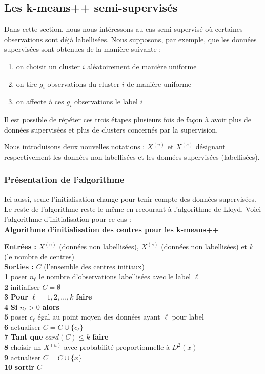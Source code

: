 \documentclass[12pt,a4paper]{book}
\newcommand{\1}{\mathds{1}}
\begin{document}
\subsection{Les k-means++ semi-supervisés}

Dans cette section, nous nous intéressons au cas semi supervisé où certaines observations sont déjà labellisées. Nous supposons, par exemple, que les données supervisées sont obtenues de la manière suivante :
\begin{enumerate}
	\item on choisit un cluster $i$ aléatoirement de manière uniforme
	\item on tire $g_i$ observations du cluster $i$ de manière uniforme
	\item on affecte à ces $g_i$ observations le label $i$
\end{enumerate}
Il est possible de répéter ces trois étapes plusieurs fois de façon à avoir plus de données supervisées et plus de clusters concernés par la supervision.

Nous introduisons deux nouvelles notations : $X^{(u)}$ et $X^{(s)}$ désignant respectivement les données non labellisées et les données supervisées (labellisées). 
	
\subsubsection{Présentation de l'algorithme}

Ici aussi, seule l'initialisation change pour tenir compte des données supervisées. Le reste de l'algorithme reste le même en recourant à l'algorithme de Lloyd. Voici l'algorithme d'initialisation pour ce cas : \\

\noindent \textbf{\underline{Algorithme d'initialisation des centres pour les k-means++}}\label{algo_ss_kmeans_pp}

\noindent \textbf{Entrées : } $X^{(u)}$ (données non labellisées), $X^{(s)}$ (données non labellisées) et $k$ (le nombre de centres)\\
\noindent \textbf{Sorties : } $C$ (l'ensemble des centres initiaux) \\
\textbf{1} poser $n_{\ell}$ le nombre d'observations labellisées avec le label $\ell$\\
\textbf{2} initialiser $C=\emptyset$\\
\textbf{3} \textbf{Pour} $\ell = 1,2,...,k$ \textbf{faire} \\
\textbf{4} \indent \textbf{Si} $n_{\ell} > 0$ \textbf{alors}\\
\textbf{5} \indent \indent poser $c_\ell$ égal au point moyen des données ayant $\ell$ pour label\\
\textbf{6} \indent \indent actualiser $C = C \cup \{c_\ell \}$\\
\textbf{7} \textbf{Tant que } $card(C) \leq k$ \textbf{faire}\\
\textbf{8} \indent choisir un $X^{(u)}$ avec probabilité proportionnelle à $D^2(x)$\\
\textbf{9} \indent actualiser $C = C \cup \{x \}$\\
\textbf{10} \textbf{sortir} $C$ \\
\end{document}
